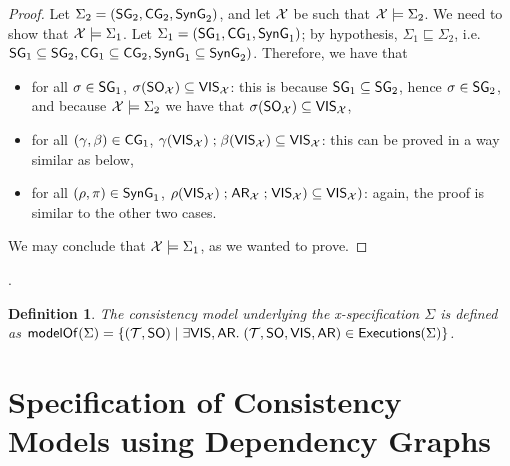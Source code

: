 \documentclass[a4paper,UKenglish]{article}%
\newif\ifdraft
\newcommand{\ac}[1]{\ifdraft{}{\color{blue}#1}\else{}\fi}
\newtheorem{definition}[theorem]{Definition}
\theoremstyle{plain}
\begin{document}
\begin{proof}
Let $\Sigma_2 = (\mathsf{SG}_2, \mathsf{CG}_2, \mathsf{SynG}_2)$, and let 
$\mathcal{X}$ be such that $\mathcal{X} \models \Sigma_2$. We need to show 
that $\mathcal{X} \models \Sigma_1$. Let $\Sigma_1 = (\mathsf{SG}_1, \mathsf{CG}_1, \mathsf{SynG}_1)$;  
by hypothesis, $\Sigma_1 \sqsubseteq \Sigma_2$, i.e. $\mathsf{SG}_1 \subseteq \mathsf{SG}_2, 
\mathsf{CG}_1 \subseteq \mathsf{CG}_2, \mathsf{SynG}_1 \subseteq \mathsf{SynG}_2)$. Therefore, we have that 
\begin{itemize}
\item for all $\sigma \in \mathsf{SG}_1$, $\sigma({\sf{SO}}_{\mathcal{X}}) \subseteq {\mathsf{VIS}}_{\mathcal{X}}$: 
this is because $\mathsf{SG}_1 \subseteq \mathsf{SG}_2$, hence $\sigma \in \mathsf{SG}_2$, and 
because $\mathcal{X} \models \Sigma_2$ we have that $\sigma({\sf{SO}}_{\mathcal{X}}) \subseteq {\mathsf{VIS}}_{\mathcal{X}}$, 
\item for all $(\gamma, \beta) \in \mathsf{CG}_1$, $\gamma({\mathsf{VIS}}_{\mathcal{X}}) \mathrel{;} \beta({\mathsf{VIS}}_{\mathcal{X}}) \subseteq 
{\mathsf{VIS}}_{\mathcal{X}}$: this can be proved in a way similar as below, 
\item for all $(\rho, \pi) \in \mathsf{SynG}_1$, $\rho({\mathsf{VIS}}_{\mathcal{X}}) \mathrel{;} {\sf{AR}}_{\mathcal{X}} \mathrel{;} {\mathsf{VIS}}_{\mathcal{X}}) \subseteq {\mathsf{VIS}}_{\mathcal{X}})$: 
again, the proof is similar to the other two cases.
\end{itemize}
We may conclude that $\mathcal{X} \models \Sigma_1$, as we wanted to prove.
\end{proof}

\ac{Todo: I never checked thoroughly that the definitions of Session Guarantees 
and Causality Guarantees are the appropriate ones. Some examples of consistency 
models that can be captured are necessary here.}
\ac{Also todo: I remember that I needed the constraint that $\rho(\VIS) \subseteq \VIS?$ 
back when the definition of specification functions was quite restrictive, but I am 
not sure whether I have used this anywhere. It could be that I can replace $\rho(\VIS)$ 
without losing any of the results in CONCUR}.


\begin{definition}
The consistency model underlying the x-specification $\Sigma$ is defined as $
\mathsf{modelOf}(\Sigma) = \{(\mathcal{T}, {\sf{SO}}) \mid 
\exists {\mathsf{VIS}}, {\sf{AR}}.\; (\mathcal{T}, {\sf{SO}}, {\mathsf{VIS}}, {\sf{AR}}) \in {\mathsf{Executions}}(\Sigma)\}$.
\end{definition}

\section{Specification of Consistency Models using Dependency Graphs} 
\end{document}
